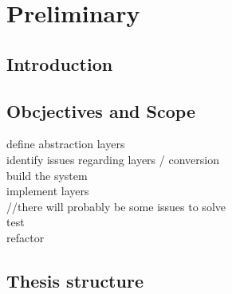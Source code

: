 \chapter{Preliminary}
\section{Introduction}
\section{Obcjectives and Scope}
 {
  \color{red}
  define abstraction layers\\
  identify issues regarding layers / conversion\\
  build the system\\
  implement layers\\
  //there will probably be some issues to solve\\
  test\\
  refactor
 }
\section{Thesis structure}
